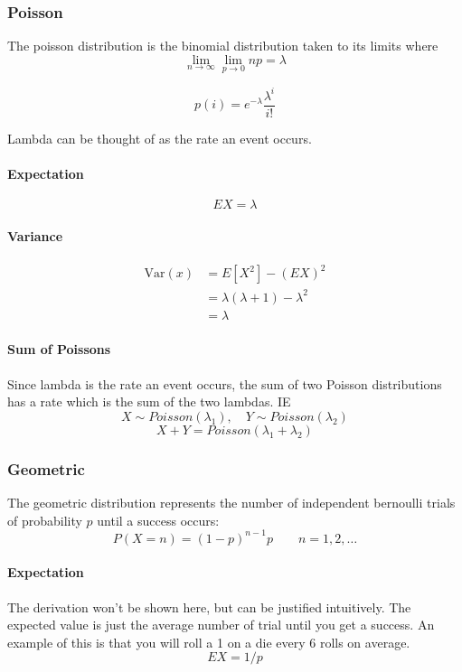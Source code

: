 \subsubsection{Poisson}
The poisson distribution is the binomial distribution taken to its limits where 
$$\lim_{n \to \infty} \lim_{p \to 0} np = \lambda$$

$$p(i) = e^{-\lambda} \frac{\lambda^i}{i!}$$

Lambda can be thought of as the rate an event occurs.

\paragraph{Expectation}
$$EX = \lambda$$

\paragraph{Variance}
    \begin{equation*}
    \begin{aligned}
        \text{Var}(x) &= E[X^2] - (EX)^2 \\
                      &= \lambda (\lambda+1) - \lambda^2 \\
                      &= \lambda
    \end{aligned}
    \end{equation*}

    \paragraph{Sum of Poissons}
    Since lambda is the rate an event occurs, the sum of two Poisson distributions has a rate which is the sum of the two lambdas. IE
    $$X \sim Poisson(\lambda_1), \quad Y \sim Poisson(\lambda_2)$$
    $$X + Y = Poisson(\lambda_1 + \lambda_2)$$


\subsubsection{Geometric}
The geometric distribution represents the number of independent bernoulli trials of probability $p$ until a success occurs:
$$P(X=n) = (1-p)^{n-1}p \qquad n=1,2,\dots$$

\paragraph{Expectation}
The derivation won't be shown here, but  can be justified intuitively. The expected value is just the average number of trial until you get a success. An example of this is that you will roll a 1 on a die every 6 rolls on average.
$$EX = 1/p$$

